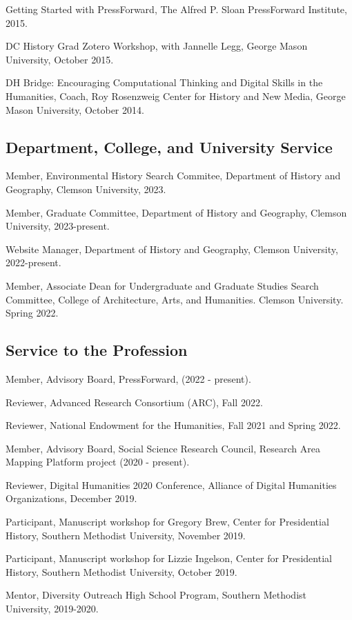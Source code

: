 \documentclass[11pt]{article}
\begin{document}
Getting Started with PressForward, The Alfred P. Sloan PressForward Institute, 2015.

DC History Grad Zotero Workshop, with Jannelle Legg, George Mason University, October 2015.

DH Bridge: Encouraging Computational Thinking and Digital Skills in the Humanities, Coach, Roy Rosenzweig Center for History and New Media, George Mason University, October 2014.

\subsection{Department, College, and University Service}\label{Department, College, and University Service}
Member, Environmental History Search Commitee, Department of History and Geography, Clemson University, 2023.

Member, Graduate Committee, Department of History and Geography, Clemson University, 2023-present.

Website Manager, Department of History and Geography, Clemson University, 2022-present.

Member, Associate Dean for Undergraduate and Graduate Studies Search Committee, College of Architecture, Arts, and Humanities. Clemson University. Spring 2022.

\subsection{Service to the Profession}\label{Other Professional and Community Service}
Member, Advisory Board, PressForward, (2022 - present).

Reviewer, Advanced Research Consortium (ARC), Fall 2022. 

Reviewer, National Endowment for the Humanities, Fall 2021 and Spring 2022.

Member, Advisory Board, Social Science Research Council, Research Area Mapping Platform project (2020 - present).

Reviewer, Digital Humanities 2020 Conference, Alliance of Digital Humanities Organizations, December 2019.

Participant, Manuscript workshop for Gregory Brew, Center for Presidential History, Southern Methodist University, November 2019.

Participant, Manuscript workshop for Lizzie Ingelson, Center for Presidential History, Southern Methodist University, October 2019.

Mentor, Diversity Outreach High School Program, Southern Methodist University, 2019-2020.
\end{document}
